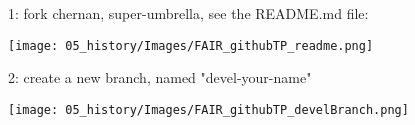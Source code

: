 \begin{frame}{ }
\begin{exampleblock}{1: fork chernan, super-umbrella, see the README.md file:}
    \begin{center}
    \texttt{[image: 05\_history/Images/FAIR\_githubTP\_readme.png]}
    \end{center}
\end{exampleblock}
\end{frame}
\begin{frame}{ }
\begin{exampleblock}{2: create a new branch, named "devel-your-name"}
    \begin{center}
    \texttt{[image: 05\_history/Images/FAIR\_githubTP\_develBranch.png]}
    \end{center}
\end{exampleblock}
\end{frame}

